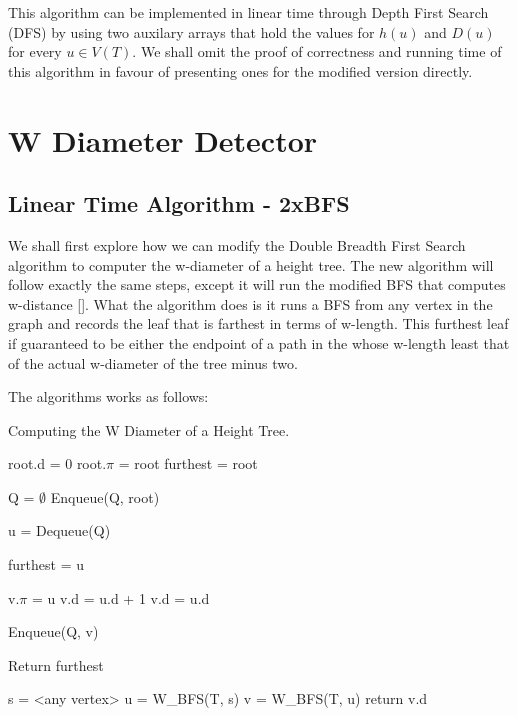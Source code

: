 This algorithm can be implemented in linear time through Depth First Search (DFS) by using two auxilary arrays that hold the values for $h(u)$ and $D(u)$ for every $u \in V(T)$. We shall omit the proof of correctness and running time of this algorithm in favour of presenting ones for the modified version directly.


\section{W Diameter Detector}


\subsection{Linear Time Algorithm - 2xBFS}

We shall first explore how we can modify the Double Breadth First Search algorithm to computer the w-diameter of a height tree. The new algorithm will follow exactly the same steps, except it will run the modified BFS that computes w-distance []. What the algorithm does is it runs a BFS from any vertex in the graph and records the leaf that is farthest in terms of w-length. This furthest leaf if guaranteed to be either the endpoint of a path in the whose w-length least that of the actual w-diameter of the tree minus two. 

The algorithms works as follows:


\begin{algorithm}
\caption{Computing the W Diameter of a Height Tree.}

\begin{algorithmic}[1]

    \State root.d = 0
    \State root.$\pi$ = root
    \State furthest = root

    \State Q = $\emptyset$
    \State Enqueue(Q, root)

        \State u = Dequeue(Q)

            \State furthest = u
        \EndIf

                \State v.$\pi$ = u
                    \State v.d = u.d + 1
                \Else
                    \State v.d = u.d
                \EndIf

                \State Enqueue(Q, v)

            \EndIf
        \EndFor
    \EndWhile
    \State Return furthest
\EndFunction

    \State s = <any vertex>
    \State u = W\_BFS(T, s)
    \State v = W\_BFS(T, u)
    \State return v.d
\EndFunction

\end{algorithmic}
\end{algorithm}

